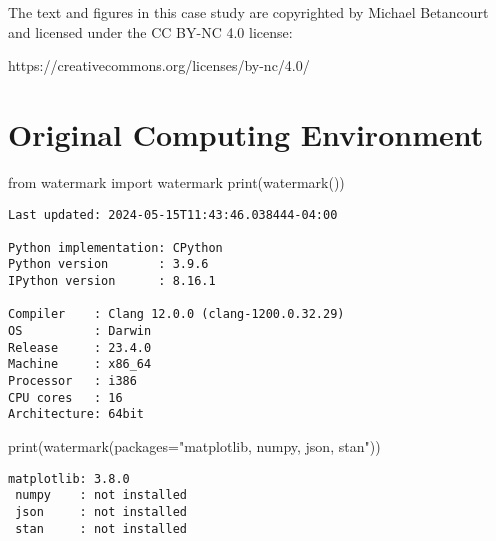\documentclass[
  letterpaper,
  DIV=11,
  numbers=noendperiod]{scrartcl}
\newenvironment{Shaded}{\begin{snugshade}}{\end{snugshade}}
\newcommand{\BuiltInTok}[1]{\textcolor[rgb]{0.00,0.23,0.31}{#1}}
\newcommand{\ImportTok}[1]{\textcolor[rgb]{0.00,0.46,0.62}{#1}}
\newcommand{\NormalTok}[1]{\textcolor[rgb]{0.00,0.23,0.31}{#1}}
\newcommand{\OperatorTok}[1]{\textcolor[rgb]{0.37,0.37,0.37}{#1}}
\newcommand{\StringTok}[1]{\textcolor[rgb]{0.13,0.47,0.30}{#1}}
\begin{document}
The text and figures in this case study are copyrighted by Michael
Betancourt and licensed under the CC BY-NC 4.0 license:

https://creativecommons.org/licenses/by-nc/4.0/

\section*{Original Computing
Environment}\label{original-computing-environment}

\begin{Shaded}
\begin{Highlighting}[]
\ImportTok{from}\NormalTok{ watermark }\ImportTok{import}\NormalTok{ watermark}
\BuiltInTok{print}\NormalTok{(watermark())}
\end{Highlighting}
\end{Shaded}

\begin{verbatim}
Last updated: 2024-05-15T11:43:46.038444-04:00

Python implementation: CPython
Python version       : 3.9.6
IPython version      : 8.16.1

Compiler    : Clang 12.0.0 (clang-1200.0.32.29)
OS          : Darwin
Release     : 23.4.0
Machine     : x86_64
Processor   : i386
CPU cores   : 16
Architecture: 64bit
\end{verbatim}

\begin{Shaded}
\begin{Highlighting}[]
\BuiltInTok{print}\NormalTok{(watermark(packages}\OperatorTok{=}\StringTok{"matplotlib, numpy, json, stan"}\NormalTok{))}
\end{Highlighting}
\end{Shaded}

\begin{verbatim}
matplotlib: 3.8.0
 numpy    : not installed
 json     : not installed
 stan     : not installed
\end{verbatim}
\end{document}
